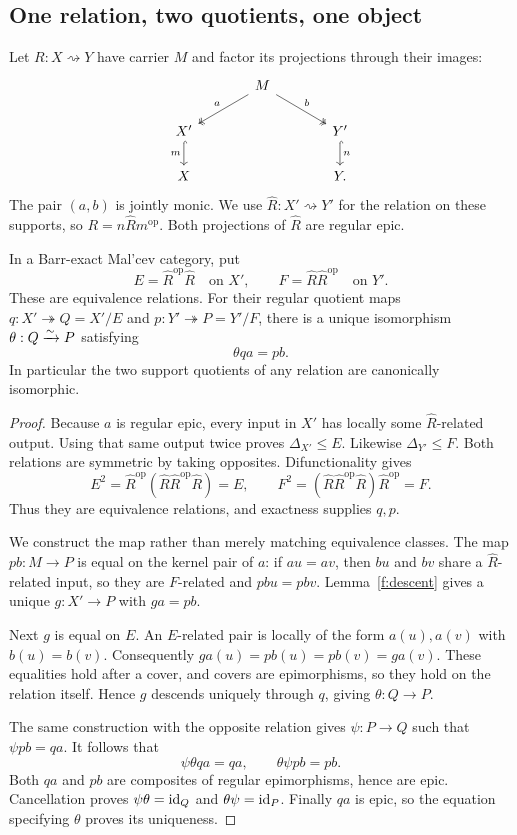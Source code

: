 \subsection{One relation, two quotients, one object}

Let $R:X\rightsquigarrow Y$ have carrier $M$ and factor its projections
through their images:
\[
\begin{tikzcd}[column sep=large]
&M \arrow[dl,two heads,"a"'] \arrow[dr,two heads,"b"]&\\
X' \arrow[d,hook,"m"'] &&Y' \arrow[d,hook,"n"]\\
X&&Y.
\end{tikzcd}
\]
The pair $(a,b)$ is jointly monic. We use $\widehat R:X'\rightsquigarrow Y'$
for the relation on these supports, so $R=n\widehat Rm^{\mathrm{op}}$.
Both projections of $\widehat R$ are regular epic.

\begin{theorem}\label{d:comparison}
In a Barr-exact Mal'cev category, put
\[
E=\widehat R^{\mathrm{op}}\widehat R
\quad\text{on }X',\qquad
F=\widehat R\widehat R^{\mathrm{op}}
\quad\text{on }Y'.
\]
These are equivalence relations. For their regular quotient maps
$q:X'\twoheadrightarrow Q=X'/E$ and
$p:Y'\twoheadrightarrow P=Y'/F$, there is a unique isomorphism
$\theta:Q\xrightarrow{\sim} P$ satisfying
\[
\theta qa=pb.
\]
In particular the two support quotients of any relation are canonically
isomorphic.
\end{theorem}
\begin{proof}
Because $a$ is regular epic, every input in $X'$ has locally some
$\widehat R$-related output. Using that same output twice proves
$\Delta_{X'}\leq E$. Likewise $\Delta_{Y'}\leq F$. Both relations are
symmetric by taking opposites. Difunctionality gives
\[
E^2=\widehat R^{\mathrm{op}}
 (\widehat R\widehat R^{\mathrm{op}}\widehat R)=E,
\qquad
F^2=(\widehat R\widehat R^{\mathrm{op}}\widehat R)
 \widehat R^{\mathrm{op}}=F.
\]
Thus they are equivalence relations, and exactness supplies $q,p$.

We construct the map rather than merely matching equivalence classes.
The map $pb:M\to P$ is equal on the kernel pair of $a$: if $au=av$,
then $bu$ and $bv$ share a $\widehat R$-related input, so they are
$F$-related and $pbu=pbv$. Lemma~\ref{f:descent} gives a unique
$g:X'\to P$ with $ga=pb$.

Next $g$ is equal on $E$. An $E$-related pair is locally of the form
$a(u),a(v)$ with $b(u)=b(v)$. Consequently
$ga(u)=pb(u)=pb(v)=ga(v)$. These equalities hold after a cover,
and covers are epimorphisms, so they hold on the relation itself.
Hence $g$ descends uniquely through $q$, giving $\theta:Q\to P$.

The same construction with the opposite relation gives $\psi:P\to Q$
such that $\psi pb=qa$. It follows that
\[
\psi\theta qa=qa,\qquad \theta\psi pb=pb.
\]
Both $qa$ and $pb$ are composites of regular epimorphisms, hence are
epic. Cancellation proves $\psi\theta=\mathrm{id}_Q$ and
$\theta\psi=\mathrm{id}_P$. Finally $qa$ is epic, so the equation specifying
$\theta$ proves its uniqueness.
\end{proof}

